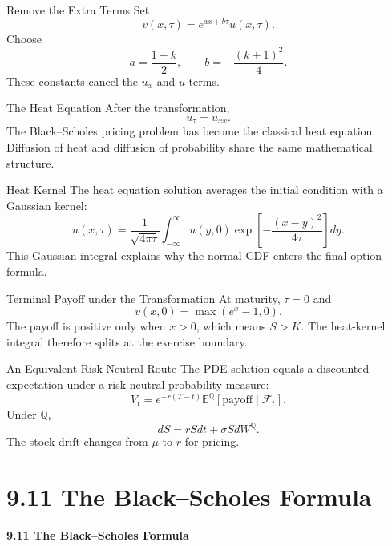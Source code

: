 \documentclass[aspectratio=169]{beamer}
\newcommand{\E}{\mathbb{E}}
\begin{document}
\begin{frame}[t]{Remove the Extra Terms}
\justifying
Set
\[v(x,\tau)=e^{ax+b\tau}u(x,\tau).\]
Choose
\[a=\frac{1-k}{2},\qquad b=-\frac{(k+1)^2}{4}.\]
These constants cancel the $u_x$ and $u$ terms.
\end{frame}

\begin{frame}[t]{The Heat Equation}
\justifying
After the transformation,
\[u_\tau=u_{xx}.\]
The Black--Scholes pricing problem has become the classical heat equation. Diffusion of heat and diffusion of probability share the same mathematical structure.
\end{frame}

\begin{frame}[t]{Heat Kernel}
\justifying
\small
The heat equation solution averages the initial condition with a Gaussian kernel:
\[u(x,\tau)=\frac{1}{\sqrt{4\pi\tau}}\int_{-\infty}^{\infty}u(y,0)\exp\left[-\frac{(x-y)^2}{4\tau}\right]dy.\]
This Gaussian integral explains why the normal CDF enters the final option formula.
\end{frame}

\begin{frame}[t]{Terminal Payoff under the Transformation}
\justifying
At maturity, $\tau=0$ and
\[v(x,0)=\max(e^x-1,0).\]
The payoff is positive only when $x>0$, which means $S>K$. The heat-kernel integral therefore splits at the exercise boundary.
\end{frame}

\begin{frame}[t]{An Equivalent Risk-Neutral Route}
\justifying
The PDE solution equals a discounted expectation under a risk-neutral probability measure:
\[V_t=e^{-r(T-t)}\E^{\mathbb Q}[\text{payoff}\mid\mathcal F_t].\]
Under $\mathbb Q$,
\[dS=rSdt+\sigma SdW^{\mathbb Q}.\]
The stock drift changes from $\mu$ to $r$ for pricing.
\end{frame}

\section{9.11 The Black--Scholes Formula}
\begin{frame}[plain]
\centering\vfill
{\color{TitleBlue}\Large\bfseries 9.11 The Black--Scholes Formula}\par
\vspace{0.5cm}{\large Evaluation of the discounted payoff integral}\par
\vfill\end{frame}
\end{document}
